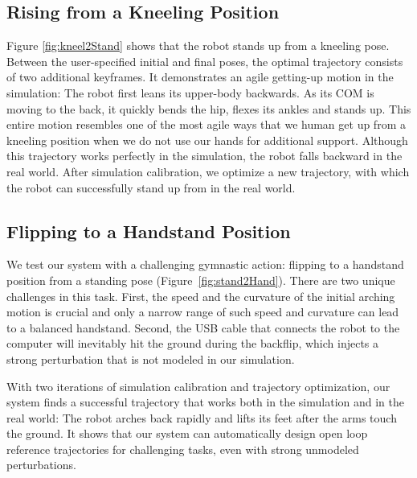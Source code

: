 \subsection{Rising from a Kneeling Position}

Figure \ref{fig:kneel2Stand} shows that the robot stands up from a kneeling pose. Between the user-specified initial and final poses, the optimal trajectory consists of two additional keyframes. It demonstrates an agile getting-up motion in the simulation: The robot first leans its upper-body backwards. As its COM is moving to the back, it quickly bends the hip, flexes its ankles and stands up. This entire motion resembles one of the most agile ways that we human get up from a kneeling position when we do not use our hands for additional support. Although this trajectory works perfectly in the simulation, the robot falls backward in the real world. After simulation calibration, we optimize a new trajectory, with which the robot can successfully stand up from in the real world.

\subsection{Flipping to a Handstand Position}
We test our system with a challenging gymnastic action: flipping to a handstand position from a standing pose (Figure~\ref{fig:stand2Hand}). There are two unique challenges in this task. First, the speed and the curvature of the initial arching motion is crucial and only a narrow range of such speed and curvature can lead to a balanced handstand. Second, the USB cable that connects the robot to the computer will inevitably hit the ground during the backflip, which injects a strong perturbation that is not modeled in our simulation.

With two iterations of simulation calibration and trajectory optimization, our system finds a successful trajectory that works both in the simulation and in the real world: The robot arches back rapidly and lifts its feet after the arms touch the ground. It shows that our system can automatically design open loop reference trajectories for challenging tasks, even with strong unmodeled perturbations.

